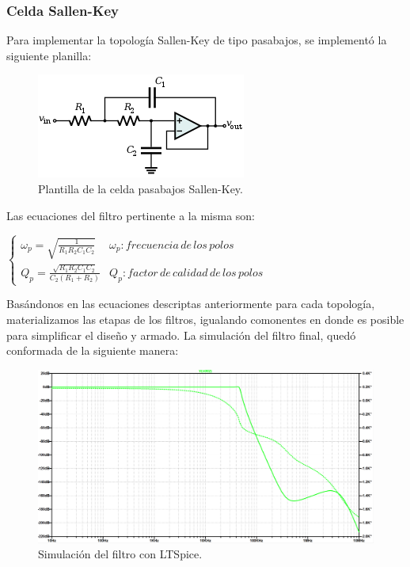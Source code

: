 \documentclass[../../ASSD_TP1_G7.tex]{subfiles}
\begin{document}
\subsubsection{Celda Sallen-Key}

Para implementar la topología Sallen-Key de tipo pasabajos, se implementó
la siguiente planilla:

\begin{figure}[H]
\begin{center}
\includegraphics{Imagenes/sallen-key.png}
\end{center}
\caption{Plantilla de la celda pasabajos Sallen-Key.}
\end{figure}

Las ecuaciones del filtro pertinente a la misma son:

$\begin{cases}
\omega_{p}=\sqrt{\frac{1}{R_{1}R_{2}C_{1}C_{2}}} & \omega_{p}:frecuencia\,de\,los\,polos\\
Q_{p}=\frac{\sqrt{R_{1}R_{2}C_{1}C_{2}}}{C_{2}(R_{1}+R_{2})} & Q_{p}:factor\,de\,calidad\,de\,los\,polos
\end{cases}$

Basándonos en las ecuaciones descriptas anteriormente para cada topología,
materializamos las etapas de los filtros, igualando comonentes en
donde es posible para simplificar el diseño y armado. La simulación
del filtro final, quedó conformada de la siguiente manera:

\begin{figure}[H]
\begin{center}
\includegraphics[scale=0.55]{Imagenes/filtroLTSpice.PNG}
\end{center}
\caption{Simulación del filtro con LTSpice.}

\end{figure}
\end{document}
